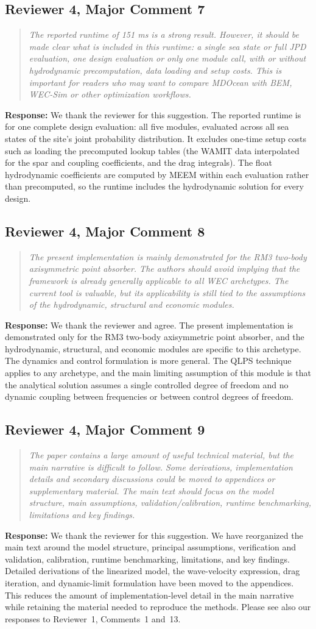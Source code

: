 \documentclass[11pt]{article}
\newcommand{\rcomment}[2]{\subsection*{#1}\begin{quote}\itshape #2\end{quote}}
\newcommand{\response}{\noindent\textbf{Response:} }
\begin{document}
\rcomment{Reviewer 4, Major Comment 7}{The reported runtime of 151 ms is a strong result. However, it should be made clear what is included in this runtime: a single sea state or full JPD evaluation, one design evaluation or only one module call, with or without hydrodynamic precomputation, data loading and setup costs. This is important for readers who may want to compare MDOcean with BEM, WEC-Sim or other optimization workflows.}
\response We thank the reviewer for this suggestion.
The reported runtime is for one complete design evaluation:
all five modules, evaluated across all sea states of the site's joint probability distribution.
It excludes one-time setup costs such as loading the precomputed lookup tables
(the WAMIT data interpolated for the spar and coupling coefficients, and the drag integrals).
The float hydrodynamic coefficients are computed by MEEM within each evaluation rather than precomputed,
so the runtime includes the hydrodynamic solution for every design. 

\rcomment{Reviewer 4, Major Comment 8}{The present implementation is mainly demonstrated for the RM3 two-body axisymmetric point absorber. The authors should avoid implying that the framework is already generally applicable to all WEC archetypes. The current tool is valuable, but its applicability is still tied to the assumptions of the hydrodynamic, structural and economic modules.}
\response We thank the reviewer and agree.
The present implementation is demonstrated only for the RM3 two-body axisymmetric point absorber, and the hydrodynamic, structural, and economic modules are specific to this archetype.
The dynamics and control formulation is more general.
The QLPS technique applies to any archetype, and the main limiting assumption of this module is that the analytical solution assumes a single controlled degree of freedom and no dynamic coupling between frequencies or between control degrees of freedom.%

\rcomment{Reviewer 4, Major Comment 9}{The paper contains a large amount of useful technical material, but the main narrative is difficult to follow. Some derivations, implementation details and secondary discussions could be moved to appendices or supplementary material. The main text should focus on the model structure, main assumptions, validation/calibration, runtime benchmarking, limitations and key findings.}
\response We thank the reviewer for this suggestion. We have reorganized the main text around the model structure, principal assumptions, verification and validation, calibration, runtime benchmarking, limitations, and key findings. Detailed derivations of the linearized model, the wave-velocity expression, drag iteration, and dynamic-limit formulation have been moved to the appendices. This reduces the amount of implementation-level detail in the main narrative while retaining the material needed to reproduce the methods. Please see also our responses to Reviewer~1, Comments~1 and~13.
\end{document}
